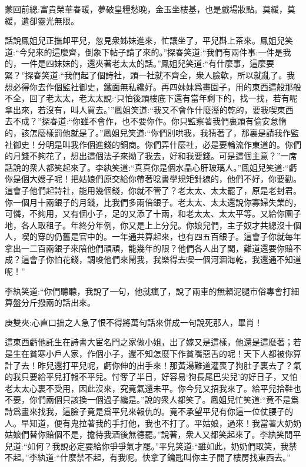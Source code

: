 

\begin{parag}
    \begin{note}蒙回前總:富貴榮華春暖，夢破皇糧愁晚，金玉坐樓基，也是戲場妝點。莫緩，莫緩，遺卻靈光無限。\end{note}
\end{parag}


\begin{parag}
    話說鳳姐兒正撫卹平兒，忽見衆姊妹進來，忙讓坐了，平兒斟上茶來。鳳姐兒笑道:“今兒來的這麼齊，倒象下帖子請了來的。”探春笑道:“我們有兩件事:一件是我的，一件是四妹妹的，還夾著老太太的話。”鳳姐兒笑道:“有什麼事，這麼要緊？”探春笑道:“我們起了個詩社，頭一社就不齊全，衆人臉軟，所以就亂了。我想必得你去作個監社御史，鐵面無私纔好。再四妹妹爲畫園子，用的東西這般那般不全，回了老太太，老太太說:‘只怕後頭樓底下還有當年剩下的，找一找，若有呢拿出來，若沒有，叫人買去。’”鳳姐笑道:“我又不會作什麼溼的乾的，要我喫東西去不成？”探春道:“你雖不會作，也不要你作。你只監察著我們裏頭有偷安怠惰的，該怎麼樣罰他就是了。”鳳姐兒笑道:“你們別哄我，我猜著了，那裏是請我作監社御史！分明是叫我作個進錢的銅商。你們弄什麼社，必是要輪流作東道的。你們的月錢不夠花了，想出這個法子來拗了我去，好和我要錢。可是這個主意？”一席話說的衆人都笑起來了。李紈笑道:“真真你是個水晶心肝玻璃人。”鳳姐兒笑道:“虧你是個大嫂子呢！把姑娘們原交給你帶著唸書學規矩針線的，他們不好，你要勸。這會子他們起詩社，能用幾個錢，你就不管了？老太太、太太罷了，原是老封君。你一個月十兩銀子的月錢，比我們多兩倍銀子。老太太、太太還說你寡婦失業的，可憐，不夠用，又有個小子，足的又添了十兩，和老太太、太太平等。又給你園子地，各人取租子。年終分年例，你又是上上分兒。你娘兒們，主子奴才共總沒十個人，喫的穿的仍舊是官中的。一年通共算起來，也有四五百銀子。這會子你就每年拿出一二百兩銀子來陪他們頑頑，能幾年的限？他們各人出了閣，難道還要你賠不成？這會子你怕花錢，調唆他們來鬧我，我樂得去喫一個河涸海乾，我還通不知道呢！”
\end{parag}


\begin{parag}
    李紈笑道:“你們聽聽，我說了一句，他就瘋了，說了兩車的無賴泥腿市俗專會打細算盤分斤撥兩的話出來。\begin{note}庚雙夾:心直口拙之人急了恨不得將萬句話來併成一句說死那人，畢肖！\end{note}這東西虧他託生在詩書大宦名門之家做小姐，出了嫁又是這樣，他還是這麼著；若是生在貧寒小戶人家，作個小子，還不知怎麼下作貧嘴惡舌的呢！天下人都被你算計了去！昨兒還打平兒呢，虧你伸的出手來！那黃湯難道灌喪了狗肚子裏去了？氣的我只要給平兒打報不平兒。忖奪了半日，好容易‘狗長尾巴尖兒’的好日子，又怕老太太心裏不受用，因此沒來，究竟氣還未平。你今兒又招我來了。給平兒拾鞋也不要，你們兩個只該換一個過子纔是。”說的衆人都笑了。鳳姐兒忙笑道:“竟不是爲詩爲畫來找我，這臉子竟是爲平兒來報仇的。竟不承望平兒有你這一位仗腰子的人。早知道，便有鬼拉著我的手打他，我也不打了。平姑娘，過來！我當著大奶奶姑娘們替你賠個不是，擔待我酒後無德罷。”說著，衆人又都笑起來了。李紈笑問平兒道:“如何？我說必定要給你爭爭氣才罷。”平兒笑道:“雖如此，奶奶們取笑，我禁不起。”李紈道:“什麼禁不起，有我呢。快拿了鑰匙叫你主子開了樓房找東西去。”
\end{parag}


